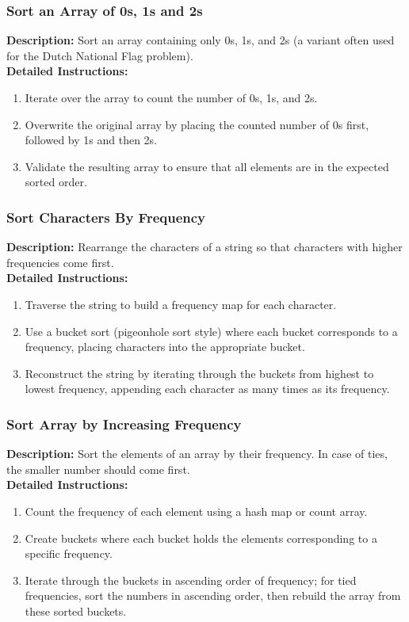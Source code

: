 \subsubsection{Sort an Array of 0s, 1s and 2s}
\textbf{Description:} Sort an array containing only 0s, 1s, and 2s (a variant often used for the Dutch National Flag problem). \\
\textbf{Detailed Instructions:}
\begin{enumerate}
    \item Iterate over the array to count the number of 0s, 1s, and 2s.
    \item Overwrite the original array by placing the counted number of 0s first, followed by 1s and then 2s.
    \item Validate the resulting array to ensure that all elements are in the expected sorted order.
\end{enumerate}

\subsubsection{Sort Characters By Frequency}
\textbf{Description:} Rearrange the characters of a string so that characters with higher frequencies come first. \\
\textbf{Detailed Instructions:}
\begin{enumerate}
    \item Traverse the string to build a frequency map for each character.
    \item Use a bucket sort (pigeonhole sort style) where each bucket corresponds to a frequency, placing characters into the appropriate bucket.
    \item Reconstruct the string by iterating through the buckets from highest to lowest frequency, appending each character as many times as its frequency.
\end{enumerate}

\subsubsection{Sort Array by Increasing Frequency}
\textbf{Description:} Sort the elements of an array by their frequency. In case of ties, the smaller number should come first. \\
\textbf{Detailed Instructions:}
\begin{enumerate}
    \item Count the frequency of each element using a hash map or count array.
    \item Create buckets where each bucket holds the elements corresponding to a specific frequency.
    \item Iterate through the buckets in ascending order of frequency; for tied frequencies, sort the numbers in ascending order, then rebuild the array from these sorted buckets.
\end{enumerate}

